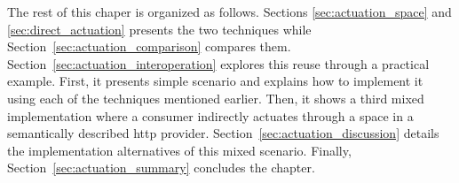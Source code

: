 The rest of this chaper is organized as follows.
Sections \ref{sec:actuation_space} and \ref{sec:direct_actuation} presents the two techniques while Section~\ref{sec:actuation_comparison} compares them.
Section~\ref{sec:actuation_interoperation} explores this reuse through a practical example. %
First, it presents simple scenario and explains how to implement it using each of the techniques mentioned earlier.
Then, it shows a third mixed implementation where a consumer indirectly actuates through a space in a semantically described \acs{http} provider. %
Section~\ref{sec:actuation_discussion} details the implementation alternatives of this mixed scenario.
Finally, Section~\ref{sec:actuation_summary} concludes the chapter.









